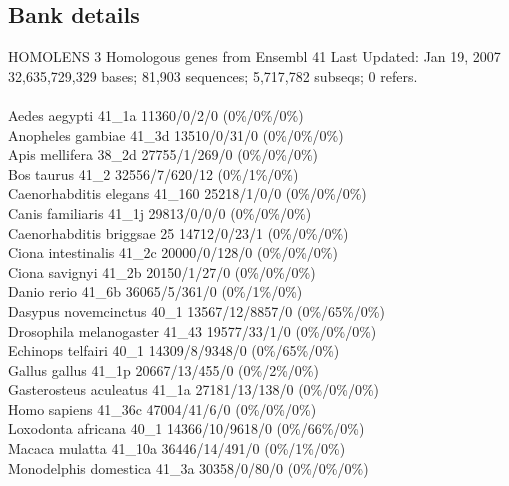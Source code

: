 \documentclass{article}
\begin{document}
\begin{Schunk}
\subsection{Bank details}
HOMOLENS 3 Homologous genes from Ensembl 41 Last Updated: Jan 19, 2007\\
32,635,729,329 bases; 81,903 sequences; 5,717,782 subseqs; 0 refers.\\
\\
Aedes aegypti                           41\_1a 11360/0/2/0 (0\%/0\%/0\%)\\
Anopheles gambiae                       41\_3d 13510/0/31/0 (0\%/0\%/0\%)\\
Apis mellifera                          38\_2d 27755/1/269/0 (0\%/0\%/0\%)\\
Bos taurus                              41\_2 32556/7/620/12 (0\%/1\%/0\%)\\
Caenorhabditis elegans                  41\_160 25218/1/0/0 (0\%/0\%/0\%)\\
Canis familiaris                        41\_1j 29813/0/0/0 (0\%/0\%/0\%)\\
Caenorhabditis briggsae                 25 14712/0/23/1 (0\%/0\%/0\%)\\
Ciona intestinalis                      41\_2c 20000/0/128/0 (0\%/0\%/0\%)\\
Ciona savignyi                          41\_2b 20150/1/27/0 (0\%/0\%/0\%)\\
Danio rerio                             41\_6b 36065/5/361/0 (0\%/1\%/0\%)\\
Dasypus novemcinctus                    40\_1 13567/12/8857/0 (0\%/65\%/0\%)\\
Drosophila melanogaster                 41\_43 19577/33/1/0 (0\%/0\%/0\%)\\
Echinops telfairi                       40\_1 14309/8/9348/0 (0\%/65\%/0\%)\\
Gallus gallus                           41\_1p 20667/13/455/0 (0\%/2\%/0\%)\\
Gasterosteus aculeatus                  41\_1a 27181/13/138/0 (0\%/0\%/0\%)\\
Homo sapiens                            41\_36c 47004/41/6/0 (0\%/0\%/0\%)\\
Loxodonta africana                      40\_1 14366/10/9618/0 (0\%/66\%/0\%)\\
Macaca mulatta                          41\_10a 36446/14/491/0 (0\%/1\%/0\%)\\
Monodelphis domestica                   41\_3a 30358/0/80/0 (0\%/0\%/0\%)\\

\end{Schunk}
\end{document}
